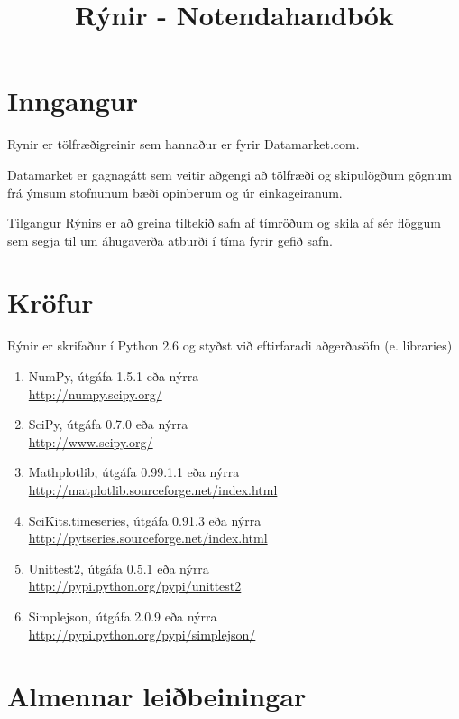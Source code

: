 \documentclass[11pt]{article}
\title{Rýnir - Notendahandbók}
\date{}
\begin{document}
\maketitle

\section{Inngangur}
Rynir er tölfræðigreinir sem hannaður er fyrir Datamarket.com.

Datamarket er gagnagátt sem veitir aðgengi að tölfræði og skipulögðum gögnum frá ýmsum stofnunum bæði opinberum og úr einkageiranum.

Tilgangur Rýnirs er að greina tiltekið safn af tímröðum og skila af sér flöggum sem segja til um áhugaverða atburði í tíma fyrir gefið safn.
 
\section{Kröfur}
Rýnir er skrifaður í Python 2.6 og styðst við eftirfaradi aðgerðasöfn (e. libraries)\\
\renewcommand{\theenumi}{\roman{enumi}}
\renewcommand{\labelenumi}{\theenumi}
\begin{enumerate}
 \item NumPy, útgáfa 1.5.1 eða nýrra\\ \url{http://numpy.scipy.org/}
 \item SciPy, útgáfa 0.7.0 eða nýrra\\ \url{http://www.scipy.org/}
 \item Mathplotlib, útgáfa 0.99.1.1 eða nýrra\\ \url{http://matplotlib.sourceforge.net/index.html}
 \item SciKits.timeseries, útgáfa 0.91.3 eða nýrra\\ \url{http://pytseries.sourceforge.net/index.html}
 \item Unittest2, útgáfa 0.5.1 eða nýrra\\ \url{http://pypi.python.org/pypi/unittest2}
 \item Simplejson, útgáfa 2.0.9 eða nýrra\\ \url{http://pypi.python.org/pypi/simplejson/}
\end{enumerate}

\section{Almennar leiðbeiningar}
\end{document}
